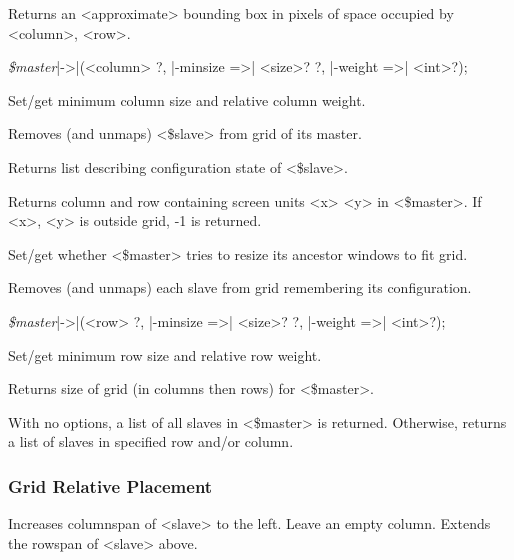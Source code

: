 \begin{enum}{1cm}

Returns an <approximate> bounding box in pixels of space occupied by <column>, <row>.

\item[{\it \$master}|->|\kwd{gridColumnconfigure}(<column> ?, |-minsize =>| <size>?]
  ?, |-weight =>| <int>?);\strut\newline
Set/get minimum column size and relative column weight.

Removes (and unmaps) <\$slave> from grid of its master.

Returns list describing configuration state of <\$slave>.

Returns column and row containing screen units <x> <y> in <\$master>.
If <x>, <y> is outside grid, -1 is returned.

Set/get whether <\$master> tries to resize its ancestor windows to fit grid.

Removes (and unmaps) each slave from grid remembering its configuration.

\item[{\it \$master}|->|\kwd{gridRowconfigure}(<row> ?, |-minsize =>| <size>?]
  ?, |-weight =>| <int>?);\strut\newline
Set/get minimum row size and relative row weight.

Returns size of grid (in columns then rows) for <\$master>.

With no options, a list of all slaves in <\$master> is returned.
Otherwise, returns a list of slaves in specified row and/or column.

\end{enum}

\subsubsection*{Grid Relative Placement}
\begin{enum}{1cm}
\Xi{|-|}  Increases columnspan of <slave> to the left.
  Leave an empty column.
\Xi{${}^\wedge$}  Extends the rowspan of <slave> above.
\end{enum}

